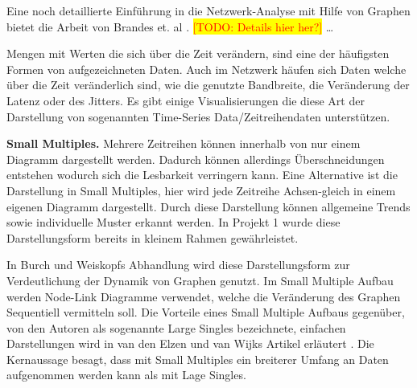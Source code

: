 \documentclass[draft=false
              ,paper=a4
              ,twoside=false
              ,fontsize=11pt
              ,headsepline
              ,BCOR10mm
              ,DIV11
              ]{scrbook}
\newcommand{\TODO}[1]{\colorbox{yellow}{\textcolor{red}{[TODO: #1]}}}
\begin{document}
Eine noch detaillierte Einführung in die Netzwerk-Analyse mit Hilfe von Graphen bietet die Arbeit von Brandes et. al \cite{brandes2005network}. \TODO{Details hier her?}
\ldots

Mengen mit Werten die sich über die Zeit verändern, sind eine der häufigsten Formen von aufgezeichneten Daten. Auch im Netzwerk häufen sich Daten welche über die Zeit veränderlich sind, wie die genutzte Bandbreite, die Veränderung der Latenz oder des Jitters. Es gibt einige Visualisierungen die diese Art der Darstellung von sogenannten Time-Series Data/Zeitreihendaten unterstützen. 

\textbf{Small Multiples.} Mehrere Zeitreihen können innerhalb von nur einem Diagramm dargestellt werden. Dadurch können allerdings Überschneidungen entstehen wodurch sich die Lesbarkeit verringern kann. Eine Alternative ist die Darstellung in Small Multiples, hier wird jede Zeitreihe Achsen-gleich in einem eigenen Diagramm dargestellt. Durch diese Darstellung können allgemeine Trends sowie individuelle Muster erkannt werden. In Projekt 1 wurde diese Darstellungsform bereits in kleinem Rahmen gewährleistet. 

In Burch und Weiskopfs Abhandlung \cite{Burch:2014:FES:2636240.2636839} wird diese Darstellungsform zur Verdeutlichung der Dynamik von Graphen genutzt. Im Small Multiple Aufbau werden Node-Link Diagramme verwendet, welche die Veränderung des Graphen Sequentiell vermitteln soll. Die Vorteile eines Small Multiple Aufbaus gegenüber, von den Autoren als sogenannte Large Singles bezeichnete, einfachen Darstellungen wird in van den Elzen und van Wijks Artikel erläutert \cite{elzen_small_multiple_2013}. Die Kernaussage besagt, dass mit Small Multiples ein breiterer Umfang an Daten aufgenommen werden kann als mit Lage Singles.
\end{document}

